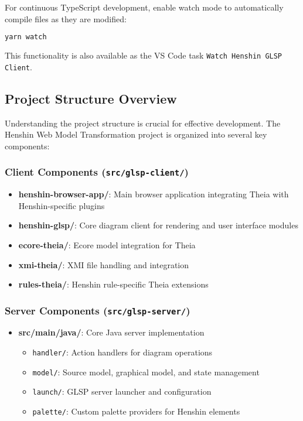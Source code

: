For continuous TypeScript development, enable watch mode to automatically compile files as they are modified:

\begin{lstlisting}[language=bash]
yarn watch
\end{lstlisting}

This functionality is also available as the VS Code task \texttt{Watch Henshin GLSP Client}.

\subsection{Project Structure Overview}
\label{subsec:project_structure}

Understanding the project structure is crucial for effective development. The Henshin Web Model Transformation project is organized into several key components:

\subsubsection{Client Components (\texttt{src/glsp-client/})}

\begin{itemize}
    \item \textbf{henshin-browser-app/}: Main browser application integrating Theia with Henshin-specific plugins
    \item \textbf{henshin-glsp/}: Core diagram client for rendering and user interface modules
    \item \textbf{ecore-theia/}: Ecore model integration for Theia
    \item \textbf{xmi-theia/}: XMI file handling and integration
    \item \textbf{rules-theia/}: Henshin rule-specific Theia extensions
\end{itemize}

\subsubsection{Server Components (\texttt{src/glsp-server/})}

\begin{itemize}
    \item \textbf{src/main/java/}: Core Java server implementation
    \begin{itemize}
        \item \texttt{handler/}: Action handlers for diagram operations
        \item \texttt{model/}: Source model, graphical model, and state management
        \item \texttt{launch/}: GLSP server launcher and configuration
        \item \texttt{palette/}: Custom palette providers for Henshin elements
    \end{itemize}
\end{itemize}

